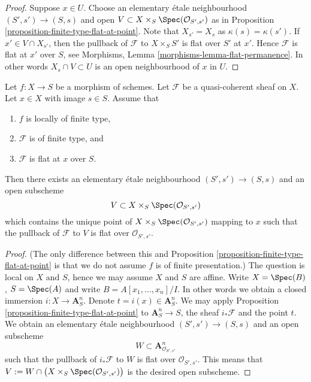 \begin{proof}
Suppose $x \in U$. Choose an elementary \'etale neighbourhood
$(S', s') \to (S, s)$ and open
$V \subset X \times_S \Spec(\mathcal{O}_{S', s'})$ as in
Proposition \ref{proposition-finite-type-flat-at-point}.
Note that $X_{s'} = X_s$ as $\kappa(s) = \kappa(s')$.
If $x' \in V \cap X_{s'}$, then the pullback of $\mathcal{F}$ to
$X \times_S S'$ is flat over $S'$ at $x'$. Hence $\mathcal{F}$ is
flat at $x'$ over $S$, see
Morphisms, Lemma \ref{morphisms-lemma-flat-permanence}.
In other words $X_s \cap V \subset U$ is an open neighbourhood
of $x$ in $U$.
\end{proof}

\begin{lemma}
\label{lemma-finite-type-flat-at-point}
Let $f : X \to S$ be a morphism of schemes.
Let $\mathcal{F}$ be a quasi-coherent sheaf on $X$.
Let $x \in X$ with image $s \in S$.
Assume that
\begin{enumerate}
\item $f$ is locally of finite type,
\item $\mathcal{F}$ is of finite type, and
\item $\mathcal{F}$ is flat at $x$ over $S$.
\end{enumerate}
Then there exists an elementary \'etale neighbourhood $(S', s') \to (S, s)$
and an open subscheme
$$
V \subset X \times_S \Spec(\mathcal{O}_{S', s'})
$$
which contains the unique point of
$X \times_S \Spec(\mathcal{O}_{S', s'})$ mapping to $x$
such that the pullback of $\mathcal{F}$ to $V$ is flat over
$\mathcal{O}_{S', s'}$.
\end{lemma}

\begin{proof}
(The only difference between this and
Proposition \ref{proposition-finite-type-flat-at-point}
is that we do not assume $f$ is of finite presentation.)
The question is local on $X$ and $S$, hence we may assume $X$ and $S$
are affine. Write $X = \Spec(B)$, $S = \Spec(A)$ and write
$B = A[x_1, \ldots, x_n]/I$. In other words we obtain a closed immersion
$i : X \to \mathbf{A}^n_S$. Denote $t = i(x) \in \mathbf{A}^n_S$.
We may apply
Proposition \ref{proposition-finite-type-flat-at-point}
to $\mathbf{A}^n_S \to S$, the sheaf $i_*\mathcal{F}$
and the point $t$. We obtain an elementary
\'etale neighbourhood $(S', s') \to (S, s)$ and an open subscheme
$$
W \subset \mathbf{A}^n_{\mathcal{O}_{S', s'}}
$$
such that the pullback of $i_*\mathcal{F}$ to $W$ is flat over
$\mathcal{O}_{S', s'}$. This means that
$V := W \cap \big(X \times_S \Spec(\mathcal{O}_{S', s'})\big)$
is the desired open subscheme.
\end{proof}

